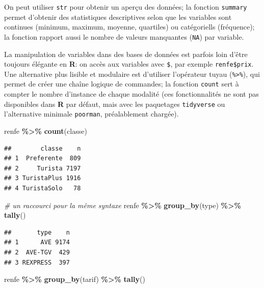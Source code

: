 \documentclass[
  11pt,
  letterpaper,
]{article}
\newenvironment{Shaded}{\begin{snugshade}}{\end{snugshade}}
\newcommand{\CommentTok}[1]{\textcolor[rgb]{0.56,0.35,0.01}{\textit{#1}}}
\newcommand{\KeywordTok}[1]{\textcolor[rgb]{0.13,0.29,0.53}{\textbf{#1}}}
\newcommand{\NormalTok}[1]{#1}
\newcommand{\OperatorTok}[1]{\textcolor[rgb]{0.81,0.36,0.00}{\textbf{#1}}}
\newcommand{\StringTok}[1]{\textcolor[rgb]{0.31,0.60,0.02}{#1}}
\theoremstyle{definition}
\theoremstyle{definition}
\theoremstyle{definition}
\theoremstyle{remark}
\begin{document}
On peut utiliser \texttt{str} pour obtenir un aperçu des données; la fonction \texttt{summary} permet d'obtenir des statistiques descriptives selon que les variables sont continues (minimum, maximum, moyenne, quartiles) ou catégoriells (fréquence); la fonction rapport aussi le nombre de valeurs manquantes (\texttt{NA}) par variable.

La manipulation de variables dans des bases de données est parfois loin d'être toujours élégante en \textbf{R}: on accès aux variables avec \texttt{\$}, par exemple \texttt{renfe\$prix}. Une alternative plus lisible et modulaire est d'utiliser l'opérateur tuyau (\texttt{\%\textgreater{}\%}), qui permet de créer une chaîne logique de commandes; la fonction \texttt{count} sert à compter le nombre d'instance de chaque modalité (ces fonctionnalités ne sont pas disponibles dans \textbf{R} par défaut, mais avec les paquetages \texttt{tidyverse} ou l'alternative minimale \texttt{poorman}, préalablement chargée).

\begin{Shaded}
\begin{Highlighting}[]
\NormalTok{renfe }\OperatorTok{\%\textgreater{}\%}\StringTok{ }\KeywordTok{count}\NormalTok{(classe)}
\end{Highlighting}
\end{Shaded}

\begin{verbatim}
##        classe    n
## 1  Preferente  809
## 2     Turista 7197
## 3 TuristaPlus 1916
## 4 TuristaSolo   78
\end{verbatim}

\begin{Shaded}
\begin{Highlighting}[]
\CommentTok{\# un raccourci pour la même syntaxe}
\NormalTok{renfe }\OperatorTok{\%\textgreater{}\%}\StringTok{ }\KeywordTok{group\_by}\NormalTok{(type) }\OperatorTok{\%\textgreater{}\%}\StringTok{ }\KeywordTok{tally}\NormalTok{()}
\end{Highlighting}
\end{Shaded}

\begin{verbatim}
##       type    n
## 1      AVE 9174
## 2  AVE-TGV  429
## 3 REXPRESS  397
\end{verbatim}

\begin{Shaded}
\begin{Highlighting}[]
\NormalTok{renfe }\OperatorTok{\%\textgreater{}\%}\StringTok{ }\KeywordTok{group\_by}\NormalTok{(tarif) }\OperatorTok{\%\textgreater{}\%}\StringTok{ }\KeywordTok{tally}\NormalTok{()}
\end{Highlighting}
\end{Shaded}
\end{document}
